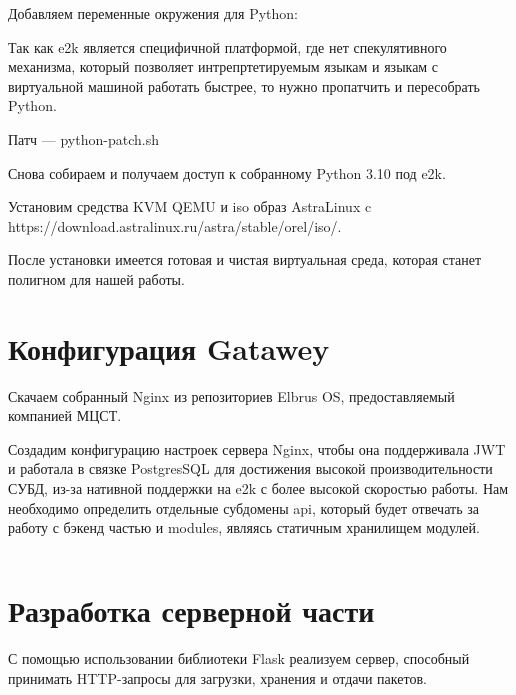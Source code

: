 \begin{listing}[H]
\end{listing}
\label{lst:c}

Добавляем переменные окружения для Python:

\begin{listing}[H]
\end{listing}
\label{lst:c}


Так как e2k является специфичной платформой, где нет спекулятивного механизма, который позволяет интрепртетируемым языкам и языкам с виртуальной машиной работать быстрее, то нужно пропатчить и пересобрать Python.

\begin{listing}[H]
\caption{Патч — python-patch.sh} 
\end{listing}
\label{lst:c}

Снова собираем и получаем доступ к собранному Python 3.10 под e2k.

Установим средства KVM QEMU и iso образ AstraLinux c https://download.astralinux.ru/astra/stable/orel/iso/.

После установки имеется готовая и чистая виртуальная среда, которая станет полигном для нашей работы. 

\section{Конфигурация Gatawey}

Скачаем собранный Nginx из репозиториев Elbrus OS, предоставляемый компанией МЦСТ.

Создадим конфигурацию настроек сервера Nginx, чтобы она поддерживала JWT и работала в связке PostgresSQL для достижения высокой производительности СУБД, из-за нативной поддержки на e2k с более высокой скоростью работы. Нам необходимо определить отдельные субдомены api, который будет отвечать за работу с бэкенд частью и modules, являясь статичным хранилищем модулей.


\inputminted[fontsize=\small]{text}{../src/nginx}

\section{Разработка серверной части}

С помощью использовании библиотеки Flask реализуем сервер, способный принимать HTTP-запросы для загрузки, хранения и отдачи пакетов.


